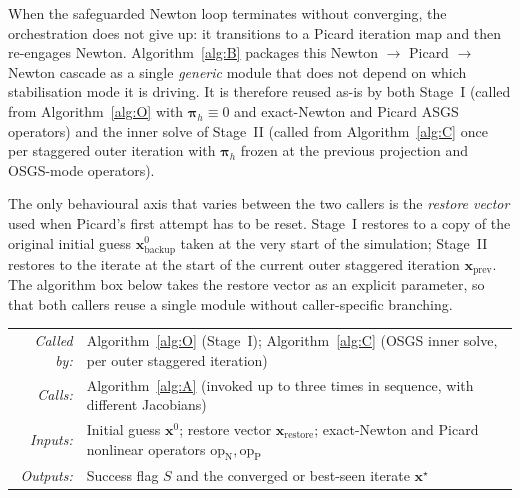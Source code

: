 \documentclass{article}
\makeatletter
\newcommand{\moduleinterface}[4]{%
\begin{interfacecard}
\footnotesize
\begin{tabular}{@{}r@{\quad}p{0.82\textwidth}@{}}
\textit{Called by:} & #1 \\
\textit{Calls:}     & #2 \\
\textit{Inputs:}    & #3 \\
\textit{Outputs:}   & #4 \\
\end{tabular}
\end{interfacecard}
}
\makeatother
\begin{document}
When the safeguarded Newton loop terminates without converging, the
orchestration does not give up: it transitions to a Picard iteration
map and then re-engages Newton. Algorithm~\ref{alg:B} packages this
Newton $\to$ Picard $\to$ Newton cascade as a single \emph{generic}
module that does not depend on which stabilisation mode it is driving.
It is therefore reused as-is by both Stage~I (called from
Algorithm~\ref{alg:O} with $\boldsymbol{\pi}_h \equiv 0$ and exact-Newton
and Picard ASGS operators) and the inner solve of Stage~II (called from
Algorithm~\ref{alg:C} once per staggered outer iteration with
$\boldsymbol{\pi}_h$ frozen at the previous projection and OSGS-mode
operators).

The only behavioural axis that varies between the two callers is the
\emph{restore vector} used when Picard's first attempt has to be reset.
Stage~I restores to a copy of the original initial guess
$\boldsymbol{x}^0_{\mathrm{backup}}$ taken at the very start of the
simulation; Stage~II restores to the iterate at the start of the
current outer staggered iteration $\boldsymbol{x}_{\mathrm{prev}}$. The
algorithm box below takes the restore vector as an explicit parameter,
so that both callers reuse a single module without
caller-specific branching.

\moduleinterface
    {Algorithm~\ref{alg:O} (Stage~I); Algorithm~\ref{alg:C} (OSGS inner solve, per outer staggered iteration)}
    {Algorithm~\ref{alg:A} (invoked up to three times in sequence, with different Jacobians)}
    {Initial guess $\boldsymbol{x}^0$; restore vector $\boldsymbol{x}_{\mathrm{restore}}$; exact-Newton and Picard nonlinear operators $\mathrm{op}_{\mathrm{N}}, \mathrm{op}_{\mathrm{P}}$}
    {Success flag $S$ and the converged or best-seen iterate $\boldsymbol{x}^\star$}
\end{document}
